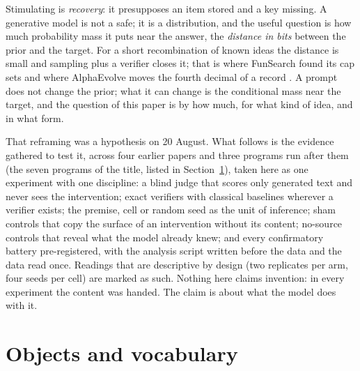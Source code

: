 \documentclass[11pt]{article}
\begin{document}
Stimulating is \emph{recovery}: it presupposes an item stored and a key
missing. A generative model is not a safe; it is a distribution, and the
useful question is how much probability mass it puts near the answer,
the \emph{distance in bits} between the prior and the target. For a short
recombination of known ideas the distance is small and sampling plus a
verifier closes it; that is where FunSearch found its cap sets
\citep{romeraparedes2024funsearch} and where AlphaEvolve moves the fourth
decimal of a record \citep{novikov2025alphaevolve}. A prompt does not
change the prior; what it can change is the conditional mass near the
target, and the question of this paper is by how much, for what kind of
idea, and in what form.

That reframing was a hypothesis on 20 August. What follows is the evidence
gathered to test it, across four earlier papers
\citep{ono2026interrupting,ono2026mass,ono2026operator,ono2026pulsed} and
three programs run after them (the seven programs of the title, listed
in Section~\ref{sec:objects}), taken here as one experiment with one
discipline: a blind judge that scores only generated text and never sees
the intervention; exact verifiers with classical baselines wherever a
verifier exists; the premise, cell or random seed as the unit of
inference; sham controls that copy the surface of an intervention without
its content; no-source controls that reveal what the model already knew;
and every confirmatory battery pre-registered, with the analysis script
written before the data and the data read once. Readings that are
descriptive by design (two replicates per arm, four seeds per cell) are
marked as such. Nothing here claims invention: in every experiment the
content was handed. The claim is about what the model does with it.

\section{Objects and vocabulary}
\label{sec:objects}
\end{document}
